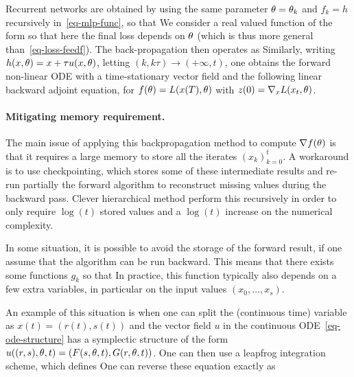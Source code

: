 Recurrent networks are obtained by using the same parameter $\theta=\theta_k$ and $f_k=h$ recursively in~\eqref{eq-mlp-func}, so that 
We consider a real valued function of the form
so that here the final loss depends on $\theta$ (which is thus more general than~\eqref{eq-loss-feedf}).
%
The back-propagation then operates as 
Similarly, writing $h(x,\theta) = x + \tau u(x,\theta)$, letting $(k,k\tau) \rightarrow (+\infty,t)$, one obtains the forward non-linear ODE with a time-stationary vector field
and the following linear backward adjoint equation, for $f(\theta)=L(x(T),\theta)$
with $z(0) = \nabla_x L(x_t,\theta)$. 


\paragraph{Mitigating memory requirement. }

The main issue of applying this backpropagation method to compute $\nabla f(\theta)$ is that it requires a large memory to store all the iterates $(x_k)_{k=0}^t$. A workaround is to use checkpointing, which stores some of these intermediate results and re-run partially the forward algorithm to reconstruct missing values during the backward pass. Clever hierarchical method perform this recursively in order to only require $\log(t)$ stored values and a $\log(t)$ increase on the numerical complexity. 

In some situation, it is possible to avoid the storage of the forward result, if one assume that the algorithm can be run backward. This means that there exists some functions $g_k$ so that 
In practice, this function typically also depends on a few extra variables, in particular on the input values $(x_0,\ldots,x_s)$.

An example of this situation is when one can split the (continuous time) variable as $x(t)=(r(t),s(t))$ and the vector field $u$ in the continuous ODE~\eqref{eq-ode-structure} has a symplectic structure of the form $u((r,s),\theta,t) = ( F(s,\theta,t),G(r,\theta,t) )$. One can then use a leapfrog integration scheme, which defines  
One can reverse these equation exactly as

